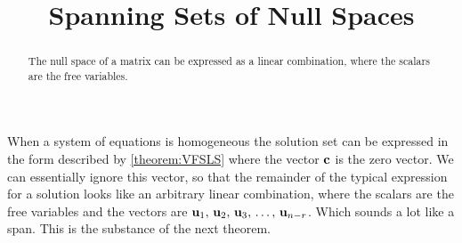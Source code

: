 \documentclass{ximera}
\title{Spanning Sets of Null Spaces}
\begin{document}
\begin{abstract}
  The null space of a matrix can be expressed as a linear combination,
  where the scalars are the free variables.
\end{abstract}
\maketitle

When a system of equations is homogeneous the solution set can be
expressed in the form described by \ref{theorem:VFSLS} where the
vector $\mathbf{c}$ is the zero vector.  We can essentially ignore this
vector, so that the remainder of the typical expression for a solution
looks like an arbitrary linear combination, where the scalars are the
free variables and the vectors are $\mathbf{u}_{1},\,\mathbf{u}_{2},\,\mathbf{u}_{3},\,\ldots,\,\mathbf{u}_{n-r}$.  Which
sounds a lot like a span.  This is the substance of the next theorem.
\end{document}
